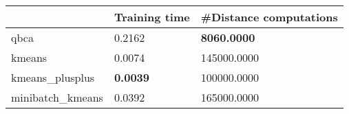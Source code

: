 \begin{table}[htbp]
\centering
\begin{tabular}{lll}
\toprule
 & Training time & #Distance computations \\
\midrule
qbca & 0.2162 & \textbf{8060.0000} \\
kmeans & 0.0074 & 145000.0000 \\
kmeans_plusplus & \textbf{0.0039} & 100000.0000 \\
minibatch_kmeans & 0.0392 & 165000.0000 \\
\bottomrule
\end{tabular}
\end{table}
